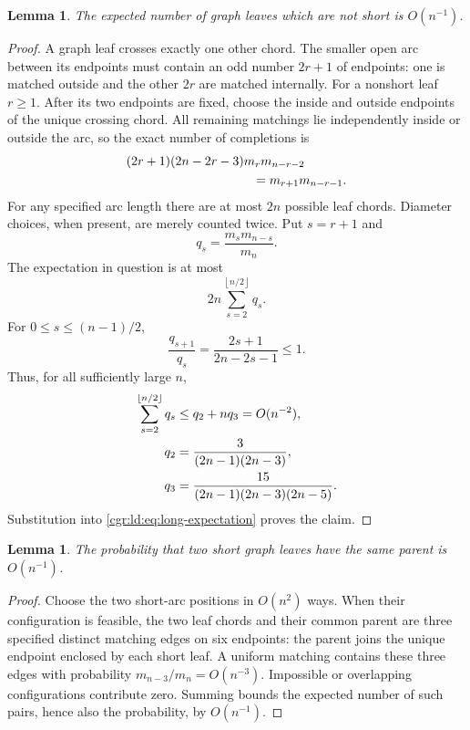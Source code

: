 \documentclass[11pt,letterpaper]{article}
\numberwithin{equation}{section}
\newtheorem{lemma}[theorem]{Lemma}
\theoremstyle{definition}\newtheorem{definition}[theorem]{Definition}
\theoremstyle{remark}\newtheorem{remark}[theorem]{Remark}
\newcommand{\floor}[1]{\left\lfloor #1\right\rfloor}
\begin{document}
\begin{lemma}\label{cgr:ld:lem:long-leaf}
The expected number of graph leaves which are not short is
$O(n^{-1})$.
\end{lemma}
\begin{proof}
A graph leaf crosses exactly one other chord. The smaller open arc
between its endpoints must contain an odd number $2r+1$ of
endpoints: one is matched outside and the other $2r$ are matched
internally. For a nonshort leaf $r\ge1$. After its two endpoints
are fixed, choose the inside and outside endpoints of the unique
crossing chord. All remaining matchings lie independently inside
or outside the arc, so the exact number of completions is
\begin{align}
 &(2r+1)(2n-2r-3)m_rm_{n-r-2}\notag\\
 &\hspace{35mm}=m_{r+1}m_{n-r-1}.\label{cgr:ld:eq:leaf-completions}
\end{align}
For any specified arc length there are at most $2n$ possible
leaf chords. Diameter choices, when present, are merely
counted twice. Put $s=r+1$ and
\begin{equation}\label{cgr:ld:eq:q-def}
 q_s=\frac{m_sm_{n-s}}{m_n}.
\end{equation}
The expectation in question is at most
\begin{equation}\label{cgr:ld:eq:long-expectation}
 2n\sum_{s=2}^{\floor{n/2}}q_s.
\end{equation}
For $0\le s\le(n-1)/2$,
\begin{equation}\label{cgr:ld:eq:q-ratio}
 \frac{q_{s+1}}{q_s}=\frac{2s+1}{2n-2s-1}\le1.
\end{equation}
Thus, for all sufficiently large $n$,
\begin{align}
 \sum_{s=2}^{\floor{n/2}}q_s
 &\le q_2+nq_3=O(n^{-2}),\label{cgr:ld:eq:q-tail}\\
 q_2&=\frac3{(2n-1)(2n-3)},\notag\\
 q_3&=\frac{15}{(2n-1)(2n-3)(2n-5)}.\notag
\end{align}
Substitution into \eqref{cgr:ld:eq:long-expectation} proves the claim.
\end{proof}

\begin{lemma}\label{cgr:ld:lem:parents}
The probability that two short graph leaves have the same parent
is $O(n^{-1})$.
\end{lemma}
\begin{proof}
Choose the two short-arc positions in $O(n^2)$ ways. When their
configuration is feasible, the two leaf chords and their common
parent are three specified distinct matching edges on six
endpoints: the parent joins the unique endpoint enclosed by each
short leaf. A uniform matching contains these three edges with
probability $m_{n-3}/m_n=O(n^{-3})$. Impossible or overlapping
configurations contribute zero. Summing bounds the expected
number of such pairs, hence also the probability, by $O(n^{-1})$.
\end{proof}
\end{document}
